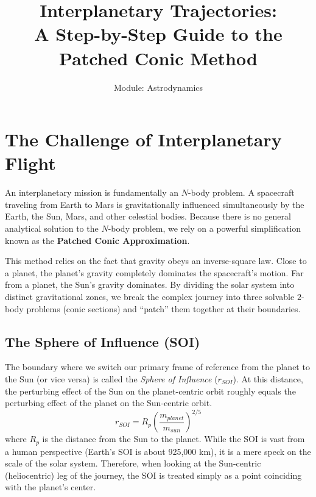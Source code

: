 \documentclass[12pt]{article}
\title{\textbf{Interplanetary Trajectories: \\ A Step-by-Step Guide to the Patched Conic Method}}
\author{Module: Astrodynamics}
\date{}
\begin{document}
\maketitle

\section*{The Challenge of Interplanetary Flight}
An interplanetary mission is fundamentally an $N$-body problem. A spacecraft traveling from Earth to Mars is gravitationally influenced simultaneously by the Earth, the Sun, Mars, and other celestial bodies. Because there is no general analytical solution to the $N$-body problem, we rely on a powerful simplification known as the \textbf{Patched Conic Approximation}.

This method relies on the fact that gravity obeys an inverse-square law. Close to a planet, the planet's gravity completely dominates the spacecraft's motion. Far from a planet, the Sun's gravity dominates. By dividing the solar system into distinct gravitational zones, we break the complex journey into three solvable $2$-body problems (conic sections) and ``patch'' them together at their boundaries.

\vspace{0.5cm}

\subsection*{The Sphere of Influence (SOI)}
The boundary where we switch our primary frame of reference from the planet to the Sun (or vice versa) is called the \textit{Sphere of Influence} ($r_{SOI}$). At this distance, the perturbing effect of the Sun on the planet-centric orbit roughly equals the perturbing effect of the planet on the Sun-centric orbit. 
\begin{equation}
    r_{SOI} = R_p \left( \frac{m_{planet}}{m_{sun}} \right)^{2/5}
\end{equation}
where $R_p$ is the distance from the Sun to the planet. While the SOI is vast from a human perspective (Earth's SOI is about 925,000 km), it is a mere speck on the scale of the solar system. Therefore, when looking at the Sun-centric (heliocentric) leg of the journey, the SOI is treated simply as a point coinciding with the planet's center.

\newpage

\end{document}
